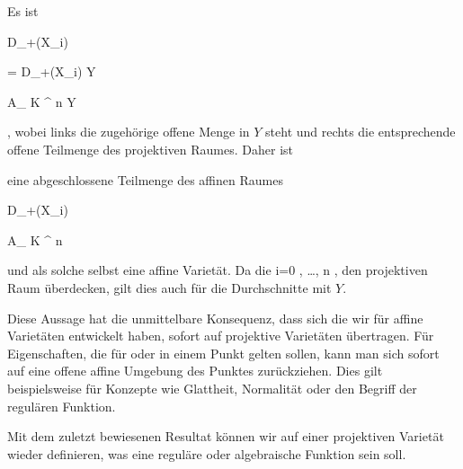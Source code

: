 {


Es ist


\mavergleichskettedisp

{\vergleichskette

{ D_+(X_i)
}

{ =} { D_+(X_i) \cap Y
}

{ \cong} { { {\mathbb A}_{  K }^{  n   } } \cap Y
}

{ } {
}

{ } {
}

}
{}{}{,}
wobei links die zugehörige offene Menge in $Y$ steht und rechts die entsprechende offene Teilmenge des projektiven Raumes. Daher ist

 eine abgeschlossene
 {} {}
Teilmenge des affinen Raumes


\mavergleichskette

{\vergleichskette

{ D_+(X_i)
}

{ \cong }{ { {\mathbb A}_{  K }^{  n   } }
}

{  }{
}

{    }{
}

{   }{
}

}
{}{}{}
und als solche selbst eine affine Varietät. Da die  { i=0 , \ldots ,  n   }{,} den projektiven Raum überdecken, gilt dies auch für die Durchschnitte mit $Y$.


}


Diese Aussage hat die unmittelbare Konsequenz, dass sich  die wir für affine Varietäten entwickelt haben, sofort auf projektive Varietäten übertragen. Für Eigenschaften, die für oder in einem Punkt gelten sollen, kann man sich sofort auf eine offene affine Umgebung des Punktes zurückziehen. Dies gilt beispielsweise für Konzepte wie Glattheit, Normalität oder den Begriff der regulären Funktion.




Mit dem zuletzt bewiesenen Resultat können wir auf einer projektiven Varietät wieder definieren, was eine reguläre oder algebraische Funktion sein soll.



{}

